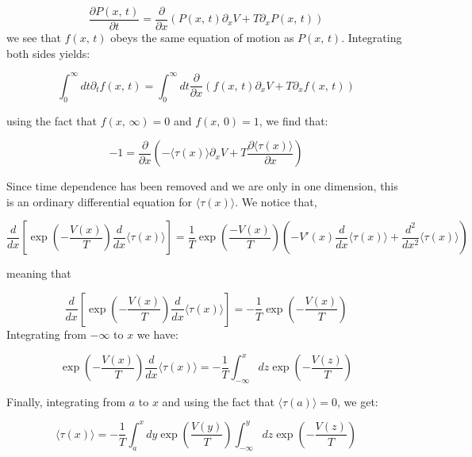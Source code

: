 \begin{equation}
\frac{\partial P(x, \, t)}{\partial t} = \frac{\partial}{\partial x} \left(P(x, \, t) \partial_x V + T \partial_x P(x, \, t) \right)
\end{equation}
we see that $f(x, \, t)$ obeys the same equation of motion as $P(x, \, t)$. Integrating both sides yields:

\begin{equation}
\int_0^{\infty} dt \partial_t f(x, \, t) = \int_0^{\infty} dt \frac{\partial}{\partial x} \left ( f(x, \, t) \partial_x V + T \partial_x f(x, \, t) \right)
\end{equation}

using the fact that $f(x, \, \infty) = 0$ and $f(x, \, 0) = 1$, we find that:

\begin{equation}
-1 = \frac{\partial}{\partial x} \left (-\langle \tau(x) \rangle \partial_x V + T \frac{ \partial \langle \tau(x) \rangle}{\partial x} \right)
\end{equation}

Since time dependence has been removed and we are only in one dimension, this is an ordinary differential equation for $\langle \tau(x) \rangle$. We notice that,

\begin{equation}
\frac{d}{dx} \left [\exp \left (-\frac{V(x)}{T} \right) \frac{d}{dx} \langle \tau(x) \rangle \right] = \frac{1}{T} \exp \left (\frac{-V(x)}{T} \right ) \left (- V'(x) \frac{d}{dx} \langle \tau(x) \rangle + \frac{d^2}{dx^2} \langle \tau(x) \rangle \right)
\end{equation}

meaning that

\begin{equation}
\frac{d}{dx} \left [\exp \left (-\frac{V(x)}{T} \right) \frac{d}{dx} \langle \tau(x) \rangle \right] = -\frac{1}{T} \exp \left(-\frac{V(x)}{T} \right)
\end{equation}
Integrating from $-\infty$ to $x$ we have:

\begin{equation}
\exp \left (-\frac{V(x)}{T} \right) \frac{d}{dx} \langle \tau(x) \rangle = -\frac{1}{T} \int_{-\infty}^x dz \exp \left(-\frac{V(z)}{T} \right)
\end{equation}

Finally, integrating from $a$ to $x$ and using the fact that $\langle \tau(a) \rangle = 0$, we get:

\begin{equation}
\langle \tau(x) \rangle = - \frac{1}{T} \int_a^{x} dy \exp \left(\frac{V(y)}{T} \right) \int_{-\infty}^y dz \exp \left(-\frac{V(z)}{T} \right)
\end{equation}

